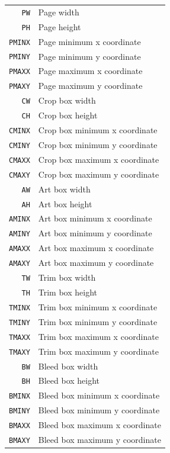 \documentclass{book}
\begin{document}
\begin{center}
\begin{tabular}{rl}
  \texttt{PW} & Page width\\
  \texttt{PH} & Page height\\
  \texttt{PMINX} & Page minimum x coordinate\\
  \texttt{PMINY} & Page minimum y coordinate\\
  \texttt{PMAXX} & Page maximum x coordinate\\
  \texttt{PMAXY} & Page maximum y coordinate\\
  \texttt{CW} & Crop box width\\
  \texttt{CH} & Crop box height\\
  \texttt{CMINX} & Crop box minimum x coordinate\\
  \texttt{CMINY} & Crop box minimum y coordinate\\
  \texttt{CMAXX} & Crop box maximum x coordinate\\
  \texttt{CMAXY} & Crop box maximum y coordinate\\
  \texttt{AW} & Art box width\\
  \texttt{AH} & Art box height\\
  \texttt{AMINX} & Art box minimum x coordinate\\
  \texttt{AMINY} & Art box minimum y coordinate\\
  \texttt{AMAXX} & Art box maximum x coordinate\\
  \texttt{AMAXY} & Art box maximum y coordinate\\
  \texttt{TW} & Trim box width\\
  \texttt{TH} & Trim box height\\
  \texttt{TMINX} & Trim box minimum x coordinate\\
  \texttt{TMINY} & Trim box minimum y coordinate\\
  \texttt{TMAXX} & Trim box maximum x coordinate\\
  \texttt{TMAXY} & Trim box maximum y coordinate\\
  \texttt{BW} & Bleed box width\\
  \texttt{BH} & Bleed box height\\
  \texttt{BMINX} & Bleed box minimum x coordinate\\
  \texttt{BMINY} & Bleed box minimum y coordinate\\
  \texttt{BMAXX} & Bleed box maximum x coordinate\\
  \texttt{BMAXY} & Bleed box maximum y coordinate\\
\end{tabular}
\end{center}
\end{document}
